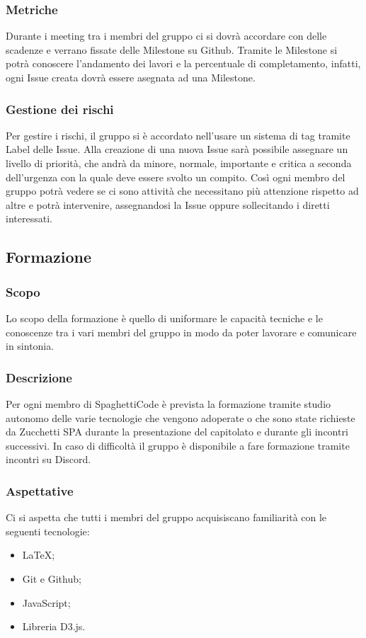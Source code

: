 \documentclass[../norme_di_progetto.tex]{subfiles}
\begin{document}
    \subsubsection{Metriche}
    Durante i meeting tra i membri del gruppo ci si dovrà accordare con delle scadenze e verrano fissate delle Milestone su Github. Tramite le Milestone si potrà conoscere l'andamento dei lavori e la percentuale di completamento, infatti, ogni Issue creata dovrà essere asegnata ad una Milestone. 
    \subsubsection{Gestione dei rischi}
    Per gestire i rischi, il gruppo si è accordato nell'usare un sistema di tag tramite Label delle Issue. Alla creazione di una nuova Issue sarà possibile assegnare un livello di priorità, che andrà da minore, normale, importante e critica a seconda dell'urgenza con la quale deve essere svolto un compito. Così ogni membro del gruppo potrà vedere se ci sono attività che necessitano più attenzione rispetto ad altre e potrà intervenire, assegnandosi la Issue oppure sollecitando i diretti interessati.

\subsection{Formazione}
    \subsubsection{Scopo}
    Lo scopo della formazione è quello di uniformare le capacità tecniche e le conoscenze tra i vari membri del gruppo in modo da poter lavorare e comunicare in sintonia.
    \subsubsection{Descrizione}
    Per ogni membro di SpaghettiCode è prevista la formazione tramite studio autonomo delle varie tecnologie che vengono adoperate o che sono state richieste da Zucchetti SPA durante la presentazione del capitolato e durante gli incontri successivi. In caso di difficoltà il gruppo è disponibile a fare formazione tramite incontri su Discord.
    \subsubsection{Aspettative}
    Ci si aspetta che tutti i membri del gruppo acquisiscano familiarità con le seguenti tecnologie:
    \begin{itemize}
        \item \LaTeX;
        \item Git e Github;
        \item JavaScript;
        \item Libreria D3.js.
    \end{itemize}
\end{document}
